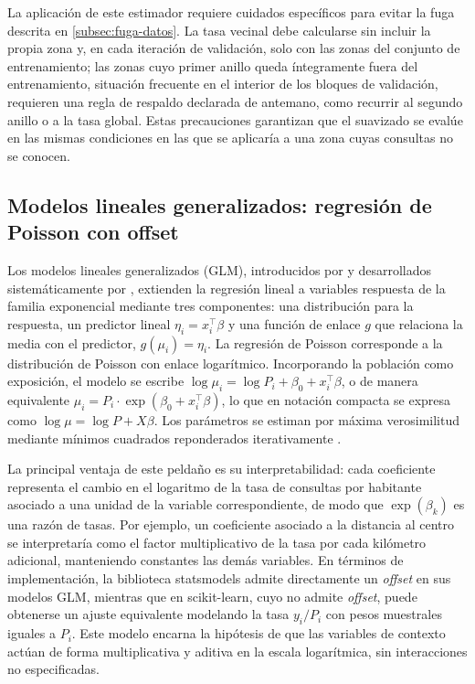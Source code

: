 La aplicación de este estimador requiere cuidados específicos para evitar la fuga descrita
en \ref{subsec:fuga-datos}. La tasa vecinal debe calcularse sin incluir la propia zona y, en
cada iteración de validación, solo con las zonas del conjunto de entrenamiento; las zonas
cuyo primer anillo queda íntegramente fuera del entrenamiento, situación frecuente en el
interior de los bloques de validación, requieren una regla de respaldo declarada de
antemano, como recurrir al segundo anillo o a la tasa global. Estas precauciones garantizan
que el suavizado se evalúe en las mismas condiciones en las que se aplicaría a una zona cuyas
consultas no se conocen.

\subsection{Modelos lineales generalizados: regresión de Poisson con offset}
\label{subsec:glm-poisson}

Los modelos lineales generalizados (GLM), introducidos por \textcite{nelder1972} y
desarrollados sistemáticamente por \textcite{mccullagh1989}, extienden la regresión lineal a
variables respuesta de la familia exponencial mediante tres componentes: una distribución
para la respuesta, un predictor lineal $\eta_i = x_i^{\top}\beta$ y una función de enlace $g$
que relaciona la media con el predictor, $g(\mu_i) = \eta_i$. La regresión de Poisson
corresponde a la distribución de Poisson con enlace logarítmico. Incorporando la población
como exposición, el modelo se escribe $\log \mu_i = \log P_i + \beta_0 + x_i^{\top}\beta$, o
de manera equivalente $\mu_i = P_i \cdot \exp(\beta_0 + x_i^{\top}\beta)$, lo que en notación
compacta se expresa como $\log \mu = \log P + X\beta$. Los parámetros se estiman por máxima
verosimilitud mediante mínimos cuadrados reponderados iterativamente
\parencite{nelder1972}.

La principal ventaja de este peldaño es su interpretabilidad: cada coeficiente representa el
cambio en el logaritmo de la tasa de consultas por habitante asociado a una unidad de la
variable correspondiente, de modo que $\exp(\beta_k)$ es una razón de tasas. Por ejemplo, un
coeficiente asociado a la distancia al centro se interpretaría como el factor multiplicativo
de la tasa por cada kilómetro adicional, manteniendo constantes las demás variables. En términos de implementación, la biblioteca statsmodels admite directamente un
\textit{offset} en sus modelos GLM, mientras que en scikit-learn, cuyo
 no admite \textit{offset}, puede obtenerse un ajuste equivalente
modelando la tasa $y_i / P_i$ con pesos muestrales iguales a $P_i$. Este modelo encarna la
hipótesis de que las variables de contexto actúan de forma multiplicativa y aditiva en la
escala logarítmica, sin interacciones no especificadas.

